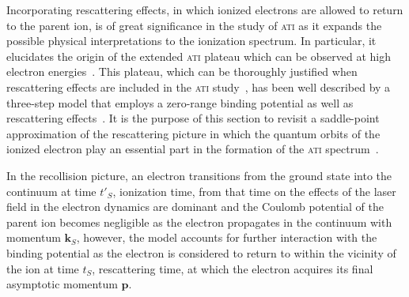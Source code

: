 Incorporating rescattering effects, in which ionized electrons are
allowed to return to the parent ion, is of great significance in the
study of \textsc{ati} as it expands the possible physical
interpretations to the ionization spectrum. In particular, it
elucidates the origin of the extended \textsc{ati} plateau which can
be observed at high electron energies~\cite{Walker_1996}. This
plateau, which can be thoroughly justified when rescattering effects
are included in the \textsc{ati}
study~\cite{Paulus_1994plateau,BeckerRescattering_2018}, has been well
described by a three-step model that employs a zero-range binding
potential as well as rescattering
effects~\cite{Becker_rescattering1994,Kopold_1997sfa}. It is the
purpose of this section to revisit a saddle-point approximation of the
rescattering picture in which the quantum orbits of the ionized
electron play an essential part in the formation of the \textsc{ati}
spectrum~\cite{KopoldOptComm2000}.




In the recollision picture, an electron transitions from the ground
state into the continuum at time $t'_{S}$, ionization time, from that
time on the effects of the laser field in the electron dynamics are
dominant and the Coulomb potential of the parent ion becomes
negligible as the electron propagates in the continuum with momentum
$\mathbf{k}_{S}$, however, the model accounts for further interaction
with the binding potential as the electron is considered to return to
within the vicinity of the ion at time $t_{S}$, rescattering time, at
which the electron acquires its final asymptotic momentum
$\mathbf{p}$.


